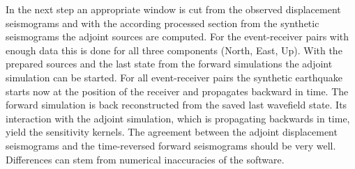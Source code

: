 In the next step an appropriate window %
is cut from the observed displacement seismograms and with the according processed section from the synthetic seismograms 
the adjoint sources are computed.
For the event-receiver pairs with enough data this is done for all three components (North, East, Up).
With the prepared sources and the last state from the forward simulations the adjoint simulation can be started.
For all event-receiver pairs the synthetic earthquake starts now at the position of the receiver and propagates
backward in time.  
The forward simulation is back reconstructed from the saved last wavefield state. 
Its interaction with the adjoint simulation, which is propagating backwards in time,
yield the sensitivity kernels. %
The agreement between the adjoint displacement seismograms and the time-reversed forward seismograms should be very well.
Differences can stem from numerical inaccuracies of the software. %








